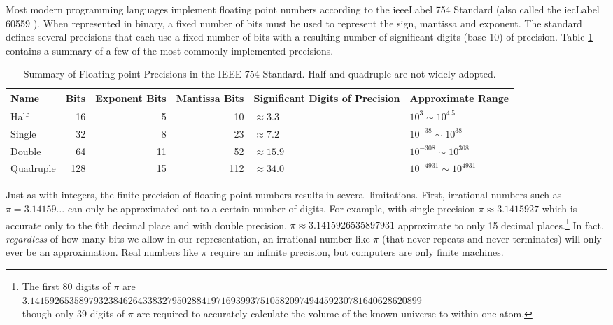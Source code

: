 Most modern programming languages implement floating point numbers according to the
\gls{ieeeLabel} 754 Standard \cite{P754:2008:ISF} (also called the \gls{iecLabel} 60559 \cite{IEC:1989:IBF}).
When represented in binary, a fixed number of bits must be used to represent the sign, mantissa
and exponent.  The standard defines several precisions that each use a fixed number of bits with
a resulting number of significant digits (base-10) of precision.  Table \ref{table:ieee754Summary}
contains a summary of a few of the most commonly implemented precisions.

\begin{table}
\centering
\begin{tabular}{l|r|r|r|p{3cm}|p{3cm}}
Name & Bits & Exponent Bits & Mantissa Bits & Significant Digits of Precision & Approximate Range\\
\hline\hline
Half & 16 & 5 & 10 & $\approx 3.3$ & $10^{3} \sim 10^{4.5}$\\
Single & 32 & 8 &  23 & $\approx 7.2$ & $10^{-38} \sim 10^{38}$\\
Double & 64 & 11 & 52 & $\approx 15.9$ & $10^{-308} \sim 10^{308}$ \\
Quadruple & 128 & 15 & 112 & $\approx 34.0$ & $10^{-4931} \sim 10^{4931}$ \\
\end{tabular}
\caption[Summary of Floating-point Precisions in the IEEE 754 Standard]{Summary of Floating-point Precisions in the IEEE 754 Standard.  Half and
quadruple are not widely adopted.}
\label{table:ieee754Summary}
\end{table}

Just as with integers, the finite precision of floating point numbers results in 
several limitations.  First, irrational numbers such as $\pi = 3.14159\ldots$ 
can only be approximated out to a certain number of digits.  For example, 
with single precision $\pi \approx 3.1415927$ which is accurate only to the 
6th decimal place and with double precision, $\pi \approx 3.1415926535897931$
approximate to only 15 decimal places.\footnote{The first 80 digits of $\pi$ are\\ 
$3.14159265358979323846264338327950288419716939937510582097494459230781640628620899$\\ 
though only 39 digits of $\pi$ are required to accurately calculate the volume of the known universe to within one atom.}
In fact, \emph{regardless} of how many bits we allow in our representation, 
an irrational number like $\pi$ (that never repeats and never terminates) will
only ever be an approximation.  Real numbers like $\pi$ require an infinite
precision, but computers are only finite machines.  

